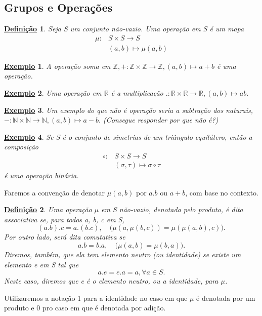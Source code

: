 \documentclass{article}
\newtheorem*{def*}{\underline{Defini\c c\~ao}}
\newtheorem{example*}{\underline{Exemplo}}
\begin{document}
\subsection{Grupos e Opera\c c\~oes}
 \begin{def*}
   Seja S um conjunto n\~ao-vazio. Uma opera\c c\~ao em S \'e um mapa
   \begin{align*}
     \mu:&S \times S\rightarrow S\\
         &(a, b)\mapsto{\mu(a, b)}
   \end{align*}
 \end{def*}
\begin{example*}
  A opera\c c\~ao soma em $\mathbb{Z}, +:\mathbb{Z}\times{\mathbb{Z}}\rightarrow \mathbb{Z}, (a, b)\mapsto a + b$ \'e uma opera\c c\~ao.
\end{example*}
\begin{example*}
  Uma opera\c c\~ao em $\mathbb{R}$ \'e a multiplica\c c\~ao $.:\mathbb{R}\times{\mathbb{R}}\rightarrow \mathbb{R}, (a, b)\mapsto ab.$
\end{example*}
\begin{example*}
  Um exemplo do que n\~ao \'e opera\c c\~ao seria a subtra\c c\~ao dos naturais, $-:\mathbb{N}\times{\mathbb{N}}\rightarrow \mathbb{N}, (a, b)\mapsto a - b.$ (Consegue responder por que n\~ao \'e?)
\end{example*}
\begin{example*}
  Se S \'e o conjunto de simetrias de um tri\^angulo equil\'atero, ent\~ao a composi\c c\~ao
  \begin{align*}
    \circ: &S\times{S}\rightarrow S \\
           &(\sigma, \tau)\mapsto \sigma\circ \tau
  \end{align*}
  \'e uma opera\c c\~ao bin\'aria.
\end{example*}
  Faremos a conven\c c\~ao de denotar $\mu(a, b)$ por $a.b$ ou $a + b$, com base no contexto.
 \begin{def*}
   Uma opera\c c\~ao $\mu$ em S n\~ao-vazio, denotada pelo produto, \'e dita associativa se, para todos a, b, c em S,
   $$
      (a.b).c = a.(b.c), \quad \biggl(\mu(a, \mu(b, c)) = \mu(\mu(a, b), c)\biggr).
   $$
   Por outro lado, ser\'a dita comutativa se 
   $$
      a.b = b.a, \quad \biggl(\mu(a, b) = \mu(b, a)\biggr).
   $$
   Diremos, tamb\'em, que ela tem elemento neutro (ou identidade) se existe um elemento e em S tal que 
   $$
    a.e = e.a = a,\forall a\in{S}.
   $$
   Neste caso, diremos que e \'e o elemento neutro, ou a identidade, para $\mu$.
 \end{def*}
  Utilizaremos a nota\c c\~ao 1 para a identidade no caso em que $\mu$ \'e denotada por um produto e 0 pro caso em que \'e denotada por adi\c c\~ao.
\end{document}
